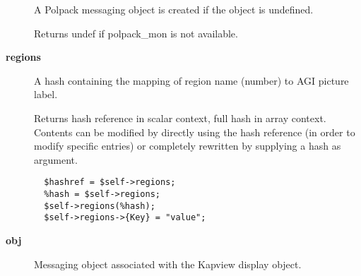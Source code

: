 \begin{description}
A Polpack messaging object is created if the object is undefined.



Returns undef if polpack\_mon is not available.


\item[{\textbf{regions}}] \mbox{}

A hash containing the mapping of region name (number) to
AGI picture label.



Returns hash reference in scalar context, full hash in array context.
Contents can be modified by directly using the hash reference
(in order to modify specific entries) or completely rewritten by
supplying a hash as argument.

\begin{verbatim}
  $hashref = $self->regions;
  %hash = $self->regions;
  $self->regions(%hash);
  $self->regions->{Key} = "value";
\end{verbatim}

\item[{\textbf{obj}}] \mbox{}

Messaging object associated with the Kapview display object.

\end{description}
